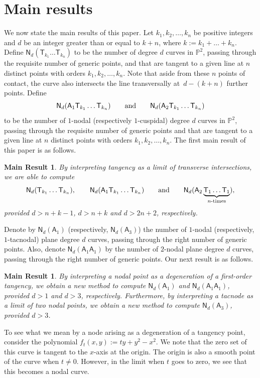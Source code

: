 \documentclass[pdftex]{sigma}
\numberwithin{equation}{section}
\newtheorem{mresult}[thm]{Main Result}
 {\theoremstyle{definition}
\newtheorem{que}[thm]{Question}
\newtheorem{conj}[thm]{Conjecture}
\newtheorem{eg}[thm]{Example}
\newtheorem{abuse_of_notation}[thm]{Abuse of Notation}
\newtheorem{claim}[thm]{Claim}
\newtheorem{verify}[thm]{Verification}
\newtheorem{result}[thm]{Result}

\newtheorem{notn}[thm]{Notation}
\newtheorem{exrc}[thm]{Exercise}

\newtheorem{rem}[thm]{Remark}
\newtheorem*{remm}{Remark}
\newtheorem{defn}[thm]{Definition} }
\begin{document}
\section{Main results}
\label{mr_s}
We now state the main results of this paper.
Let $k_1, k_2, \dots, k_n$ be positive integers
and $d$ be an integer greater than or equal to
$k+n$,
where $k:= k_1 +\dots + k_n$.
Define
$
\mathsf{N}_d(\mathsf{T}_{k_1} \dots \mathsf{T}_{k_n})
$
to be the number of degree $d$ curves in $\mathbb{P}^2$, passing through the requisite number
of generic points, and that are tangent to a given line at $n$ distinct points with orders $k_1, k_2, \dots, k_n$. Note that aside from these $n$ points of contact,
the curve also intersects the line transversally at~${d-(k+n)}$ further points.
Define
\[
\mathsf{N}_d(\mathsf{A}_1 \mathsf{T}_{k_1} \dots \mathsf{T}_{k_n}) \qquad \textnormal{and} \qquad
\mathsf{N}_d(\mathsf{A}_2 \mathsf{T}_{k_1} \dots \mathsf{T}_{k_n})
\]
to be the number of $1$-nodal (respectively $1$-cuspidal)
degree $d$ curves in $\mathbb{P}^2$, passing through the requisite number
of generic points and that are tangent to a given line at $n$ distinct points with orders $k_1, k_2,\dots, k_n$.
The first main result of this paper is as follows.
\begin{mresult}
\label{m_rslt1}
By interpreting tangency as a limit of transverse intersections,
we are able to compute
\[\mathsf{N}_d(\mathsf{T}_{k_1} \dots \mathsf{T}_{k_n}),
\qquad \mathsf{N}_d(\mathsf{A}_1 \mathsf{T}_{k_1} \dots \mathsf{T}_{k_n})
\qquad \textnormal{and} \qquad
\mathsf{N}_d(\mathsf{A}_2 \underbrace{\mathsf{T}_{1} \dots \mathsf{T}_{1}}_{n\text{-times}}),\]
provided $d>n+k-1$, $d>n+k$ and $d>2n+2$, respectively.
\end{mresult}
Denote by $\mathsf{N}_d(\mathsf{A}_1)$ (respectively, $\mathsf{N}_d(\mathsf{A}_3)$)
the number of $1$-nodal (respectively, $1$-tacnodal)
plane degree $d$ curves, passing through the right number of generic points.
Also, denote $\mathsf{N}_d(\mathsf{A}_1 \mathsf{A}_1)$ by the number
of $2$-nodal
plane degree $d$ curves, passing through the right number of generic points.
Our next result is as follows.

\begin{mresult}
\label{m_rslt2}
By interpreting a nodal point as a degeneration of a first-order tangency,
we obtain a new method to compute
$\mathsf{N}_d(\mathsf{A}_1) $ and $
\mathsf{N}_d(\mathsf{A}_1\mathsf{A}_1)$,
provided $d>1$ and $d>3$, respectively.
Furthermore, by interpreting a tacnode as a limit of two nodal points,
we obtain a new method to compute $\mathsf{N}_d(\mathsf{A}_3)$, provided $d>3$.
\end{mresult}
To see what we mean by a node arising as a degeneration
of a tangency point, consider the polynomial $f_t(x,y):= ty + y^2 - x^2$.
We note that the zero set of this curve is tangent to the $x$-axis at the origin.
The origin is also a smooth point of the curve when $t\neq 0$. However,
in the limit when $t$
goes to zero, we see that this becomes a nodal curve.
\end{document}
